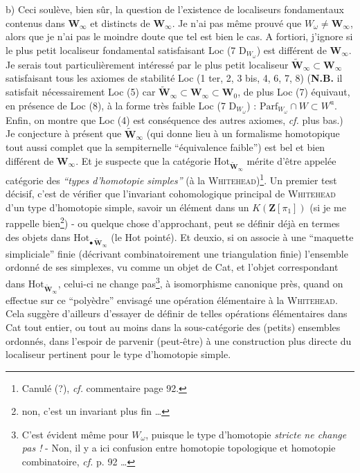 \documentclass[11pt]{article}
\newcommand{\printedpage}[1]{\marginpar{\footnotesize p.~#1}}
\newcommand{\msp}[1]{\marginpar{\footnotesize [#1]}}
\begin{document}
b) Ceci soulève, bien sûr, la question de l'existence de localiseurs fondamentaux contenus dans $\mathbf{W}_\infty$ et
\msp{page 87}
distincts de $\mathbf{W}_\infty$. Je n'ai pas même prouvé que $W_\omega \neq \mathbf{W}_\infty$, alors que je n'ai pas le moindre doute que tel est bien le cas. A fortiori, j'ignore si le plus petit localiseur fondamental satisfaisant Loc (7 D$_{W_\omega}$) est différent de $\mathbf{W}_\infty$. Je serais tout particulièrement intéressé par le plus petit localiseur $\tilde{\mathbf{W}}_\infty \subset \mathbf{W}_\infty$ satisfaisant tous les axiomes de stabilité Loc (1 ter, 2, 3 bis, 4, 6, 7, 8) (\textbf{N.B.} il satisfait
\printedpage{46}
nécessairement Loc (5) car $\tilde{\mathbf{W}}_\infty \subset \mathbf{W}_\infty \subset \mathbf{W}_0$, de plus Loc (7) équivaut, en présence de Loc (8), à la forme très faible Loc (7 D$_{W_\omega}$) : $\mathrm{Parf}_{W_\omega} \cap W \subset W^{\mathrm{u}}$. Enfin, on montre que Loc (4) est conséquence des autres axiomes, \textit{cf.} plus bas.) Je conjecture à présent que $\tilde{\mathbf{W}}_\infty$ (qui donne lieu à un formalisme homotopique tout aussi complet que la sempiternelle “équivalence faible”) est bel et bien différent de $\mathbf{W}_\infty$. Et je suspecte
\msp{page 88}
que la catégorie $\mathrm{Hot}_{\tilde{\mathbf{W}}_\infty}$ mérite d'être appelée catégorie des \textit{“types d'homotopie simples”} (à la \textsc{Whitehead})\footnote[41]{Canulé (?), \textit{cf.} commentaire page 92.}. Un premier test décisif, c'est de vérifier que l'invariant cohomologique principal de \textsc{Whitehead} d'un type d'homotopie simple, savoir un élément dans un $K(\mathbf{Z}[\pi_1])$ (si je me rappelle bien\footnote[42]{non, c'est un invariant plus fin \ldots}) - ou quelque chose d'approchant, peut se définir déjà en termes des objets dans $\mathrm{Hot}_{\bullet\,\tilde{\mathbf{W}}_\infty}$ (le Hot pointé). Et deuxio, si on associe à une “maquette simpliciale” finie (décrivant combinatoirement une triangulation finie) l'ensemble ordonné de ses simplexes, vu comme un objet de Cat, et l'objet correspondant dans $\mathrm{Hot}_{\tilde{\mathbf{W}}_\infty}$, celui-ci ne change pas\footnote[43]{C'est évident même pour $W_\omega$, puisque le type d'homotopie \textit{stricte ne change pas !} - Non, il y a ici confusion entre homotopie topologique et homotopie combinatoire, \textit{cf.} p. 92 \ldots}, à isomorphisme canonique près, quand on effectue sur ce “polyèdre” envisagé une opération élé\msp{page 89}mentaire à la \textsc{Whitehead}. Cela suggère d'ailleurs d'essayer de définir de telles opérations élémentaires dans Cat tout entier, ou tout au moins dans la sous-catégorie des (petits) ensembles ordonnés, dans l'espoir de parvenir (peut-être) à une construction plus directe du localiseur pertinent pour le type d'homotopie simple.
\end{document}
